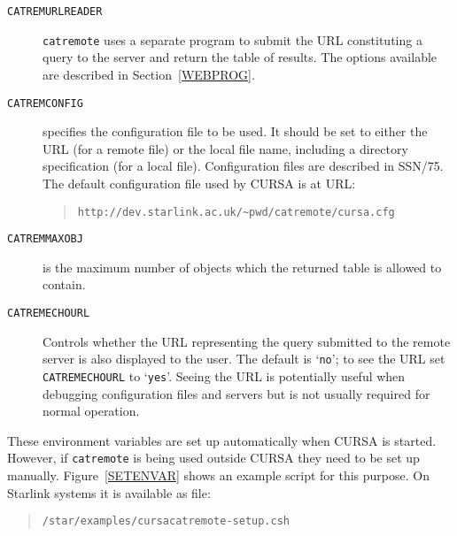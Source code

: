 \documentclass[twoside,11pt]{article}
\newcommand{\xref}[3]{#1}
\renewcommand{\_}{\texttt{\symbol{95}}}
\begin{document}
\begin{description}

  \item[{\tt CATREM\_URLREADER}] {\tt catremote} uses a separate program
   to submit the URL constituting a query to the server and return the
   table of results.  The options available are described in
   Section~\ref{WEBPROG}.

  \item[{\tt CATREM\_CONFIG}] specifies the configuration file to be used.
   It should be set to either the URL (for a remote file) or the local
   file name, including a directory specification (for a local file).
   Configuration files are described in \xref{SSN/75}{ssn75}{}\cite{SSN75}.
   The default configuration file used by CURSA is at URL:

  \begin{quote}
   {\tt http://dev.starlink.ac.uk/\~{}pwd/catremote/cursa.cfg}
  \end{quote}

  \item[{\tt CATREM\_MAXOBJ}] is the maximum number of objects which the
   returned table is allowed to contain.

  \item[{\tt CATREM\_ECHOURL}] Controls whether the URL representing the
   query submitted to the remote server is also displayed to the user.
   The default is `{\tt no}'; to see the URL set {\tt CATREM\_ECHOURL} to
   `{\tt yes}'.  Seeing the URL is potentially useful when debugging
   configuration files and servers but is not usually required for
   normal operation.

\end{description}

These environment variables are set up automatically when CURSA is started.
However, if {\tt catremote} is being used outside CURSA they need to be
set up manually.  
Figure~\ref{SETENVAR} shows an example script for this purpose.  On
Starlink systems it is available as file:

\begin{quote}
{\tt /star/examples/cursacatremote-setup.csh}
\end{quote}
\end{document}
